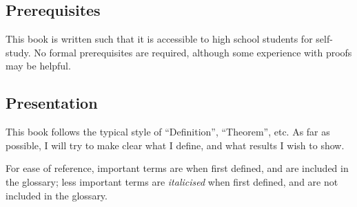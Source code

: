 \subsection*{Prerequisites}
This book is written such that it is accessible to high school students for self-study. 
No formal prerequisites are required, although some experience with proofs may be helpful.

\subsection*{Presentation}
This book follows the typical style of ``Definition'', ``Theorem'', etc.
As far as possible, I will try to make clear what I define, and what results I wish to show.

For ease of reference, important terms are  when first defined, and are included in the glossary; less important terms are \emph{italicised} when first defined, and are not included in the glossary.

